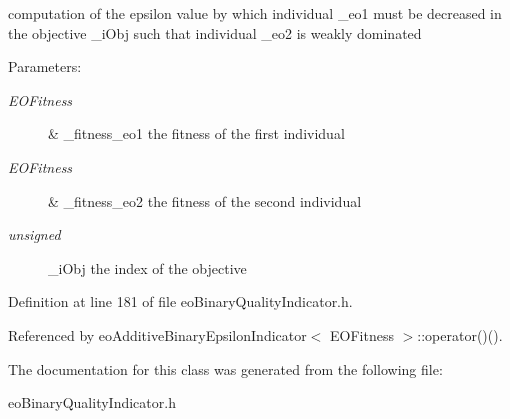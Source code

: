 computation of the epsilon value by which individual \_\-eo1 must be decreased in the objective \_\-i\-Obj such that individual \_\-eo2 is weakly dominated 

\begin{Desc}
\item[Parameters:]
\begin{description}
\item[{\em EOFitness}]\& \_\-fitness\_\-eo1 the fitness of the first individual \item[{\em EOFitness}]\& \_\-fitness\_\-eo2 the fitness of the second individual \item[{\em unsigned}]\_\-i\-Obj the index of the objective \end{description}
\end{Desc}


Definition at line 181 of file eo\-Binary\-Quality\-Indicator.h.

Referenced by eo\-Additive\-Binary\-Epsilon\-Indicator$<$ EOFitness $>$::operator()().

The documentation for this class was generated from the following file:\begin{CompactItemize}
\item 
eo\-Binary\-Quality\-Indicator.h\end{CompactItemize}
